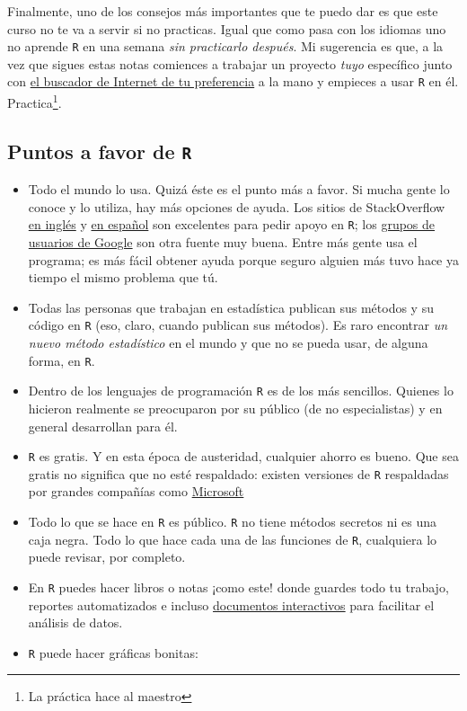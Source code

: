 \documentclass[
]{book}
\begin{document}
Finalmente, uno de los consejos más importantes que te puedo dar es que este curso no te va a servir si no practicas. Igual que como pasa con los idiomas uno no aprende \texttt{R} en una semana \emph{sin practicarlo después}. Mi sugerencia es que, a la vez que sigues estas notas comiences a trabajar un proyecto \emph{tuyo} específico junto con \href{https://yandex.com}{el buscador de Internet de tu preferencia} a la mano y empieces a usar \texttt{R} en él. Practica\footnote{La práctica hace al maestro}.

\hypertarget{puntos-a-favor-de-r}{%
\subsection{\texorpdfstring{Puntos a favor de \texttt{R}}{Puntos a favor de R}}\label{puntos-a-favor-de-r}}

\begin{itemize}
\item
  Todo el mundo lo usa. Quizá éste es el punto más a favor. Si mucha gente lo conoce y lo utiliza, hay más opciones de ayuda. Los sitios de StackOverflow \href{https://stackoverflow.com}{en inglés} y \href{https://es.stackoverflow.com}{en español} son excelentes para pedir apoyo en \texttt{R}; los \href{https://groups.google.com/forum/\#!forum/r-help-archive}{grupos de usuarios de Google} son otra fuente muy buena. Entre más gente usa el programa; es más fácil obtener ayuda porque seguro alguien más tuvo hace ya tiempo el mismo problema que tú.
\item
  Todas las personas que trabajan en estadística publican sus métodos y su código en \texttt{R} (eso, claro, cuando publican sus métodos). Es raro encontrar \emph{un nuevo método estadístico} en el mundo y que no se pueda usar, de alguna forma, en \texttt{R}.
\item
  Dentro de los lenguajes de programación \texttt{R} es de los más sencillos. Quienes lo hicieron realmente se preocuparon por su público (de no especialistas) y en general desarrollan para él.
\item
  \texttt{R} es gratis. Y en esta época de austeridad, cualquier ahorro es bueno. Que sea gratis no significa que no esté respaldado: existen versiones de \texttt{R} respaldadas por grandes compañías como \href{https://mran.microsoft.com/open}{Microsoft}
\item
  Todo lo que se hace en \texttt{R} es público. \texttt{R} no tiene métodos secretos ni es una caja negra. Todo lo que hace cada una de las funciones de \texttt{R}, cualquiera lo puede revisar, por completo.
\item
  En \texttt{R} puedes hacer libros o notas ¡como este! donde guardes todo tu trabajo, reportes automatizados e incluso \href{https://gallery.shinyapps.io/086-bus-dashboard/}{documentos interactivos} para facilitar el análisis de datos.
\item
  \texttt{R} puede hacer gráficas bonitas:
\end{itemize}
\end{document}
